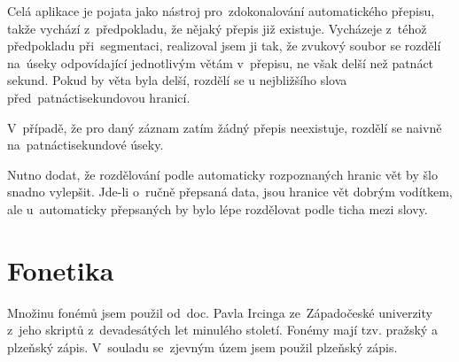 Celá aplikace je pojata jako nástroj pro~zdokonalování automatického přepisu,
takže vychází z~předpokladu, že nějaký přepis již existuje. Vycházeje z~téhož
předpokladu při~segmentaci, realizoval jsem ji tak, že zvukový soubor se rozdělí
na~úseky odpovídající jednotlivým větám v~přepisu, ne však delší než patnáct
sekund. Pokud by věta byla delší, rozdělí se u nejbližšího slova
před~patnáctisekundovou hranicí.

V~případě, že pro daný záznam zatím žádný přepis neexistuje, rozdělí se naivně
na~patnáctisekundové úseky.

Nutno dodat, že rozdělování podle automaticky rozpoznaných hranic vět by šlo
snadno vylepšit. Jde-li o~ručně přepsaná data, jsou hranice vět dobrým vodítkem,
ale u~automaticky přepsaných by bylo lépe rozdělovat podle ticha mezi slovy.

\section{Fonetika}

Množinu fonémů jsem použil od~doc. Pavla Ircinga ze~Západočeské univerzity
z~jeho skriptů z~devadesátých let minulého století. Fonémy mají tzv. pražský a
plzeňský zápis. V~souladu se~zjevným územ jsem použil plzeňský zápis.

